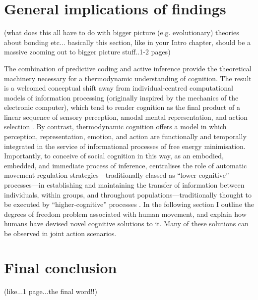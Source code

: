 \section{General implications of findings}
(what does this all have to do with bigger picture (e.g. evolutionary) theories about bonding etc... basically this section, like in your Intro chapter, should be a massive zooming out to bigger picture stuff..1-2 pages)






The combination of predictive coding and active inference provide the theoretical machinery necessary for a thermodynamic understanding of cognition.  The result is a welcomed conceptual shift away from individual-centred computational models of information processing (originally inspired by the mechanics of the electronic computer), which tend to render cognition as the final product of a linear sequence of sensory perception, amodal mental representation, and action selection \citep{Lewis2005}.  By contrast, thermodynamic cognition offers a model in which perception, representation, emotion, and action are functionally and temporally integrated in the service of informational processes of free energy minimisation.  Importantly,  to conceive of social cognition in this way, as an embodied, embedded, and immediate process of inference, centralises the role of automatic movement regulation strategies---traditionally classed as ``lower-cognitive'' processes---in establishing and maintaining the transfer of information between individuals, within groups, and throughout populations---traditionally thought to be executed by  ``higher-cognitive'' processes \citep{Claidiere2014}.
In the following section I outline the degrees of freedom problem associated with human movement, and explain how humans have devised novel cognitive solutions to it.  Many of these solutions can be observed in joint action scenarios.











\section{Final conclusion}
 (like...1 page...the final word!!)

